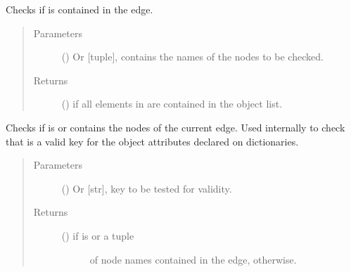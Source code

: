 \documentclass[letterpaper,10pt,english]{sphinxmanual}
\begin{document}
\begin{fulllineitems}
\begin{quote}
\begin{description}
\begin{itemize}
\end{itemize}

\end{description}\end{quote}

\begin{fulllineitems}
\label{\detokenize{main:pypath.main.Direction.check_nodes}}
Checks if  is contained in the edge.
\begin{quote}\begin{description}
\item[{Parameters}] \leavevmode
{} () \textendash{} Or {[}tuple{]}, contains the names of the nodes to be checked.

\item[{Returns}] \leavevmode
() \textendash{}  if all elements in  are
contained in the object  list.

\end{description}\end{quote}

\end{fulllineitems}


\begin{fulllineitems}
\label{\detokenize{main:pypath.main.Direction.check_param}}
Checks if  is  or contains the nodes of
the current edge. Used internally to check that  is a valid
key for the object attributes declared on dictionaries.
\begin{quote}\begin{description}
\item[{Parameters}] \leavevmode
{} () \textendash{} Or {[}str{]}, key to be tested for validity.

\item[{Returns}] \leavevmode
\begin{description}
\item[{() \textendash{}  if  is  or a tuple}] \leavevmode
of node names contained in the edge,  otherwise.


\end{description}
\end{description}
\end{quote}
\end{fulllineitems}
\end{fulllineitems}
\end{document}
